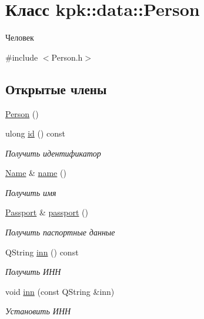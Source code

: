 \hypertarget{classkpk_1_1data_1_1_person}{}\section{Класс kpk\+:\+:data\+:\+:Person}
\label{classkpk_1_1data_1_1_person}


Человек  




{\ttfamily \#include $<$Person.\+h$>$}

\subsection*{Открытые члены}
\begin{DoxyCompactItemize}
\item 
\hyperlink{classkpk_1_1data_1_1_person_a3d3734c98d4d71765b46ba63faf40d42}{Person} ()
\item 
ulong \hyperlink{classkpk_1_1data_1_1_person_ae8b70e7cdc9ebd68052a177a08110002}{id} () const 
\begin{DoxyCompactList}\small\item\em Получить идентификатор \end{DoxyCompactList}\item 
\hyperlink{classkpk_1_1data_1_1_name}{Name} \& \hyperlink{classkpk_1_1data_1_1_person_ad67f8ee4a541984f988e909eb0f18370}{name} ()
\begin{DoxyCompactList}\small\item\em Получить имя \end{DoxyCompactList}\item 
\hyperlink{classkpk_1_1data_1_1_passport}{Passport} \& \hyperlink{classkpk_1_1data_1_1_person_a38b692a8236cba1673554b3c6ed972b3}{passport} ()
\begin{DoxyCompactList}\small\item\em Получить паспортные данные \end{DoxyCompactList}\item 
Q\+String \hyperlink{classkpk_1_1data_1_1_person_a718b0634bef8c0281a8553afafd3ffd8}{inn} () const 
\begin{DoxyCompactList}\small\item\em Получить ИНН \end{DoxyCompactList}\item 
void \hyperlink{classkpk_1_1data_1_1_person_a8a3633d768cdb21913f499d0e89b72de}{inn} (const Q\+String \&inn)
\begin{DoxyCompactList}\small\item\em Установить ИНН \end{DoxyCompactList}\item 

\end{DoxyCompactItemize}
